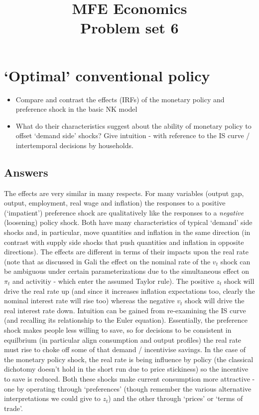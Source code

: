 \documentclass[authoryear,11pt]{elsarticle}
\begin{document}
\begin{frontmatter}
\title{MFE Economics\\Problem set 6}
\end{frontmatter}


\section{`Optimal' conventional policy}
\begin{itemize}
\item	Compare and contrast the effects (IRFs) of the monetary policy and preference shock in the basic NK model
\item	What do their characteristics suggest about the ability of monetary policy to offset `demand side' shocks? Give intuition - with reference to the IS curve / intertemporal decisions by households.
\end{itemize}

\subsection*{Answers}
The effects are very similar in many respects. For many variables (output gap, output, employment, real wage and inflation) the responses to a positive (`impatient') preference shock are qualitatively like the responses to a \textit{negative} (loosening) policy shock. Both have many characteristics of typical `demand' side shocks and, in particular, move quantities and inflation in the same direction (in contrast with supply side shocks that push quantities and inflation in opposite directions). The effects are different in terms of their impacts upon the real rate (note that as discussed in Gali the effect on the nominal rate of the $v_{t}$ shock can be ambiguous under certain parameterizations due to the simultaneous effect on $\pi_{t}$ and activitiy - which enter the assumed Taylor rule). The positive $z_{t}$ shock will drive the real rate up (and since it increases inflation expectations too, clearly the nominal interest rate will rise too) whereas the negative $v_{t}$ shock will drive the real interest rate down. Intuition can be gained from re-examining the IS curve (and recalling its relationship to the Euler equation). Essentially, the preference shock makes people less willing to save, so for decisions to be consistent in equilbrium (in particular align consumption and output profiles) the real rate must rise to choke off some of that demand / incentivise savings. In the case of the monetary policy shock, the real rate is being influence by policy (the classical dichotomy doesn't hold in the short run due to price stickiness) so the incentive to save is reduced. Both these shocks make current consumption more attractive - one by operating through `preferences' (though remember the various alternative interpretations we could give to $z_{t}$) and the other through `prices' or `terms of trade'.
\end{document}
